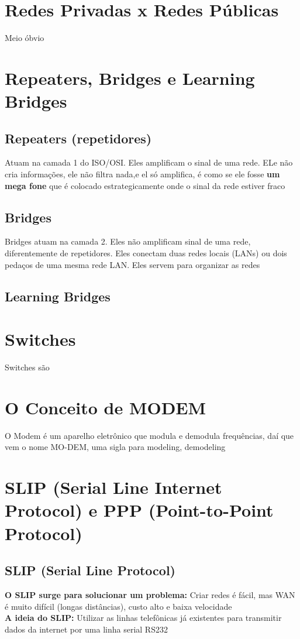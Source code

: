 \documentclass{article}
\begin{document}
\section{Redes Privadas x Redes Públicas}
Meio óbvio

\section{Repeaters, Bridges e Learning Bridges}

\subsection{Repeaters (repetidores)}
Atuam na camada 1 do ISO/OSI. Eles amplificam o sinal de uma rede. ELe não cria informações, ele não filtra nada,e el só amplifica, é como se ele fosse \textbf{um mega fone} que é colocado estrategicamente onde o sinal da rede estiver fraco

\subsection{Bridges}
Bridges atuam na camada 2. Eles não amplificam sinal de uma rede, diferentemente de repetidores. Eles conectam duas redes locais (LANs) ou dois pedaços de uma mesma rede LAN. Eles servem para organizar as redes

\subsection{Learning Bridges}

\section{Switches}
Switches são

\section{O Conceito de MODEM}
O Modem é um aparelho eletrônico que modula e demodula frequências, daí que vem o nome MO-DEM, uma sigla para modeling, demodeling

\section{SLIP (Serial Line Internet Protocol) e PPP (Point-to-Point Protocol)}

\subsection{SLIP (Serial Line Protocol)}
\textbf{O SLIP surge para solucionar um problema:} Criar redes é fácil, mas WAN é muito difícil (longas distâncias), custo alto e baixa velocidade
\\[10pt]
\textbf{A ideia do SLIP:} Utilizar as linhas telefônicas já existentes para transmitir dados da internet por uma linha serial RS232 
\end{document}
